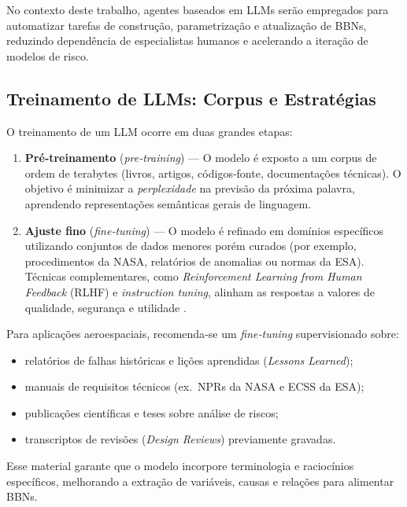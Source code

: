 No contexto deste trabalho, agentes baseados em LLMs serão empregados para automatizar tarefas de construção, parametrização e atualização de BBNs, reduzindo dependência de especialistas humanos e acelerando a iteração de modelos de risco.

\subsection{Treinamento de LLMs: Corpus e Estratégias}
\label{subsec:treino_llm}

O treinamento de um LLM ocorre em duas grandes etapas:

\begin{enumerate}
  \item \textbf{Pré‑treinamento} (\emph{pre‑training}) — O modelo é exposto a um corpus de ordem de terabytes (livros, artigos, códigos‑fonte, documentações técnicas). O objetivo é minimizar a \emph{perplexidade} na previsão da próxima palavra, aprendendo representações semânticas gerais de linguagem.
  
  \item \textbf{Ajuste fino} (\emph{fine‑tuning}) — O modelo é refinado em domínios específicos utilizando conjuntos de dados menores porém curados (por exemplo, procedimentos da NASA, relatórios de anomalias ou normas da ESA). Técnicas complementares, como \emph{Reinforcement Learning from Human Feedback} (RLHF) e \emph{instruction tuning}, alinham as respostas a valores de qualidade, segurança e utilidade \cite{ouyang2022training}.
\end{enumerate}

Para aplicações aeroespaciais, recomenda‑se um \emph{fine‑tuning} supervisionado sobre:

\begin{itemize}
  \item relatórios de falhas históricas e lições aprendidas (\emph{Lessons Learned});
  \item manuais de requisitos técnicos (ex.\ NPRs da NASA e ECSS da ESA);
  \item publicações científicas e teses sobre análise de riscos;
  \item transcriptos de revisões (\emph{Design Reviews}) previamente gravadas.
\end{itemize}

Esse material garante que o modelo incorpore terminologia e raciocínios específicos, melhorando a extração de variáveis, causas e relações para alimentar BBNs.

